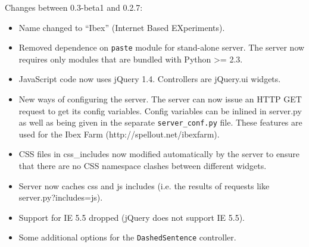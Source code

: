\documentclass[11pt,letterpaper]{article}
\begin{document}
Changes between 0.3-beta1 and 0.2.7:
\begin{itemize}

\item
 Name changed to ``Ibex'' (Internet Based EXperiments).
\item
 Removed dependence on \texttt{paste} module for stand-alone server. The server now requires only modules that are bundled with Python >= 2.3.
\item
 JavaScript code now uses jQuery 1.4. Controllers are jQuery.ui widgets.
\item
 New ways of configuring the server. The server can now issue an HTTP GET request to get its config variables. Config variables can be inlined in server.py as well as being given in the separate \texttt{server\_conf.py} file. These features are used for the Ibex Farm (http://spellout.net/ibexfarm).
\item
 CSS files in css\_includes now modified automatically by the server to ensure that there are no CSS namespace clashes between different widgets.
\item
 Server now caches css and js includes (i.e. the results of requests like server.py?includes=js).
\item
 Support for IE 5.5 dropped (jQuery does not support IE 5.5).
\item
 Some additional options for the \texttt{DashedSentence} controller.
\end{itemize}
\end{document}
